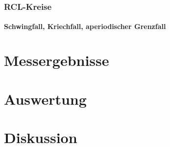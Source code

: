 \documentclass[12pt]{scrartcl}
\begin{document}
\subsubsection{RCL-Kreise}
\paragraph{Schwingfall, Kriechfall, aperiodischer Grenzfall}
\section{Messergebnisse}



\section{Auswertung}


\section{Diskussion}


\end{document}
